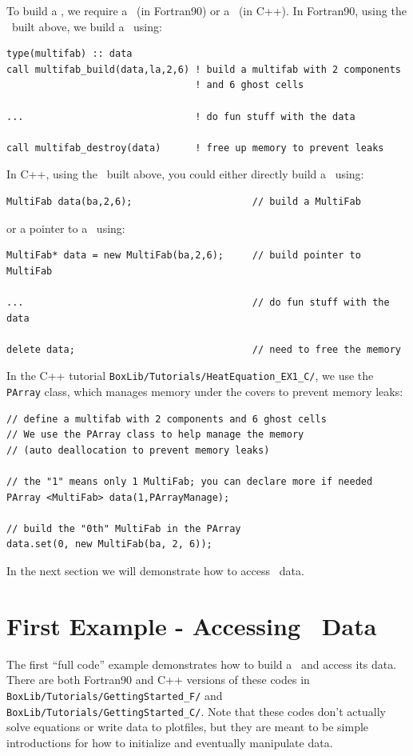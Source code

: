To build a \MultiFab, we require a \layout\ (in Fortran90) or a \BoxArray\ (in C++).
In Fortran90, using the \layout\ built above, we build a \MultiFab\ using:
\begin{lstlisting}[backgroundcolor=\color{light-green}]
type(multifab) :: data
call multifab_build(data,la,2,6) ! build a multifab with 2 components 
                                 ! and 6 ghost cells

...                              ! do fun stuff with the data

call multifab_destroy(data)      ! free up memory to prevent leaks
\end{lstlisting}
In C++, using the \BoxArray\ built above, you could either directly 
build a \MultiFab\ using:
\begin{lstlisting}[backgroundcolor=\color{light-blue}]
MultiFab data(ba,2,6);                     // build a MultiFab
\end{lstlisting}
or a pointer to a \MultiFab\ using:
\begin{lstlisting}[backgroundcolor=\color{light-blue}]
MultiFab* data = new MultiFab(ba,2,6);     // build pointer to MultiFab

...                                        // do fun stuff with the data

delete data;                               // need to free the memory
\end{lstlisting}
In the C++ tutorial {\tt BoxLib/Tutorials/HeatEquation\_EX1\_C/}, we use
the {\tt PArray} class, which manages memory under the covers
to prevent memory leaks:
\begin{lstlisting}[backgroundcolor=\color{light-blue}]
// define a multifab with 2 components and 6 ghost cells
// We use the PArray class to help manage the memory
// (auto deallocation to prevent memory leaks)

// the "1" means only 1 MultiFab; you can declare more if needed
PArray <MultiFab> data(1,PArrayManage);

// build the "0th" MultiFab in the PArray
data.set(0, new MultiFab(ba, 2, 6));
\end{lstlisting}
In the next section we will demonstrate how to access \MultiFab\ data.

\section{First Example - Accessing \MultiFab\ Data}
The first ``full code'' example demonstrates how to build a \MultiFab\ and access its data.
There are both Fortran90 and C++ versions of these codes in 
{\tt BoxLib/Tutorials/GettingStarted\_F/} and {\tt BoxLib/Tutorials/GettingStarted\_C/}.
Note that these codes don't actually solve equations or write data to plotfiles, but they
are meant to be simple introductions for how to initialize and eventually manipulate data.

